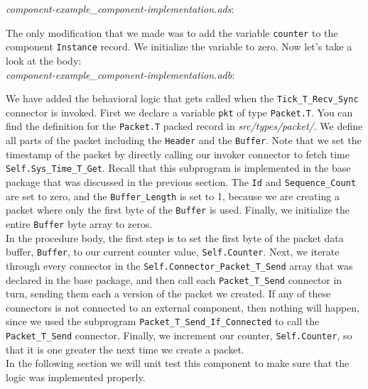 \textit{component-example\_component-implementation.ads}:

The only modification that we made was to add the variable \texttt{counter} to the component \texttt{Instance} record. We initialize the variable to zero. Now let's take a look at the body: \\

\textit{component-example\_component-implementation.adb}:

We have added the behavioral logic that gets called when the \texttt{Tick\_T\_Recv\_Sync} connector is invoked. First we declare a variable \texttt{pkt} of type \texttt{Packet.T}. You can find the definition for the \texttt{Packet.T} packed record in \textit{src/types/packet/}. We define all parts of the packet including the \texttt{Header} and the \texttt{Buffer}. Note that we set the timestamp of the packet by directly calling our invoker connector to fetch time \texttt{Self.Sys\_Time\_T\_Get}. Recall that this subprogram is implemented in the base package that was discussed in the previous section. The \texttt{Id} and \texttt{Sequence\_Count} are set to zero, and the \texttt{Buffer\_Length} is set to 1, because we are creating a packet where only the first byte of the \texttt{Buffer} is used. Finally, we initialize the entire \texttt{Buffer} byte array to zeros. \\

In the procedure body, the first step is to set the first byte of the packet data buffer, \texttt{Buffer}, to our current counter value, \texttt{Self.Counter}. Next, we iterate through every connector in the \texttt{Self.Connector\_Packet\_T\_Send} array that was declared in the base package, and then call each \texttt{Packet\_T\_Send} connector in turn, sending them each a version of the packet we created. If any of these connectors is not connected to an external component, then nothing will happen, since we used the subprogram \texttt{Packet\_T\_Send\_If\_Connected} to call the \texttt{Packet\_T\_Send} connector. Finally, we increment our counter, \texttt{Self.Counter}, so that it is one greater the next time we create a packet. \\

In the following section we will unit test this component to make sure that the logic was implemented properly.

